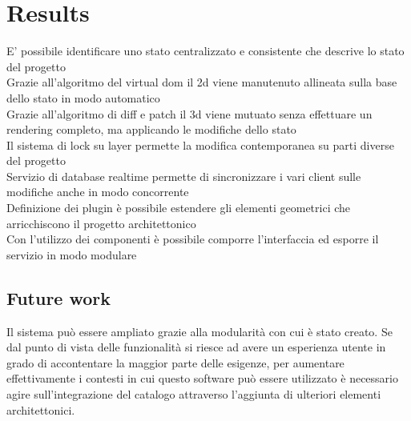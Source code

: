 \section{Results}


E' possibile identificare uno stato centralizzato e consistente che descrive lo stato del progetto\\
Grazie all'algoritmo del virtual dom il 2d viene manutenuto allineata sulla base dello stato in modo automatico\\
Grazie all'algoritmo di diff e patch il 3d viene mutuato senza effettuare un rendering completo, ma applicando le modifiche dello stato\\
Il sistema di lock su layer permette la modifica contemporanea su parti diverse del progetto\\
Servizio di database realtime permette di sincronizzare i vari client sulle modifiche anche in modo concorrente\\
Definizione dei plugin è possibile estendere gli elementi geometrici che arricchiscono il progetto architettonico\\
Con l'utilizzo dei componenti è possibile comporre l'interfaccia ed esporre il servizio in modo modulare\\



\subsection{Future work}
Il sistema può essere ampliato grazie alla modularità con cui è stato creato. Se dal punto di vista delle funzionalità si riesce ad avere un esperienza utente in grado di accontentare la maggior parte delle esigenze, per aumentare effettivamente i contesti in cui questo software può essere utilizzato è necessario agire sull'integrazione del catalogo attraverso l'aggiunta di ulteriori elementi architettonici.